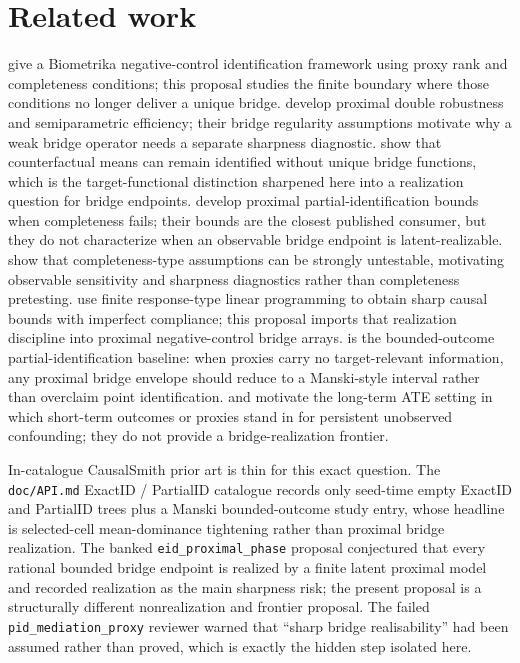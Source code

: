 \documentclass[11pt]{article}
\theoremstyle{definition}
\theoremstyle{plain}
\theoremstyle{remark}
\begin{document}
\section{Related work}
\citet[Sections 2--3]{MiaoGengTchetgen2018} give a Biometrika negative-control
identification framework using proxy rank and completeness conditions; this
proposal studies the finite boundary where those conditions no longer deliver a
unique bridge.  \citet[Section 3 and equation (9)]{CuiPuShiMiaoTchetgen2024}
develop proximal double robustness and semiparametric efficiency; their bridge
regularity assumptions motivate why a weak bridge operator needs a separate
sharpness diagnostic.  \citet[abstract and Sections 2--3]{ZhangLiMiaoTchetgen2023}
show that counterfactual means can remain identified without unique bridge
functions, which is the target-functional distinction sharpened here into a
realization question for bridge endpoints.  \citet[abstract and Sections
3--4]{GhassamiShpitserTchetgen2023} develop proximal partial-identification
bounds when completeness fails; their bounds are the closest published
consumer, but they do not characterize when an observable bridge endpoint is
latent-realizable.  \citet[Theorem 1 and Section 4]{CanaySantosShaikh2013}
show that completeness-type assumptions can be strongly untestable, motivating
observable sensitivity and sharpness diagnostics rather than completeness
pretesting.  \citet{BalkePearl1997} use finite response-type linear programming
to obtain sharp causal bounds with imperfect compliance; this proposal imports
that realization discipline into proximal negative-control bridge arrays.
\citet{Manski1990} is the bounded-outcome partial-identification baseline:
when proxies carry no target-relevant information, any proximal bridge envelope
should reduce to a Manski-style interval rather than overclaim point
identification.  \citet[Sections 2--3]{AtheyChettyImbensKang2019} and
\citet[Sections 2--4]{ImbensKallusMaoWang2025} motivate the long-term ATE
setting in which short-term outcomes or proxies stand in for persistent
unobserved confounding; they do not provide a bridge-realization frontier.

In-catalogue CausalSmith prior art is thin for this exact question.  The
\texttt{doc/API.md} ExactID / PartialID catalogue records only seed-time empty
ExactID and PartialID trees plus a Manski bounded-outcome study entry, whose
headline is selected-cell mean-dominance tightening rather than proximal bridge
realization.  The banked \texttt{eid\_proximal\_phase} proposal conjectured
that every rational bounded bridge endpoint is realized by a finite latent
proximal model and recorded realization as the main sharpness risk; the
present proposal is a structurally different nonrealization and frontier
proposal.  The failed \texttt{pid\_mediation\_proxy} reviewer warned that
``sharp bridge realisability'' had been assumed rather than proved, which is
exactly the hidden step isolated here.
\end{document}
